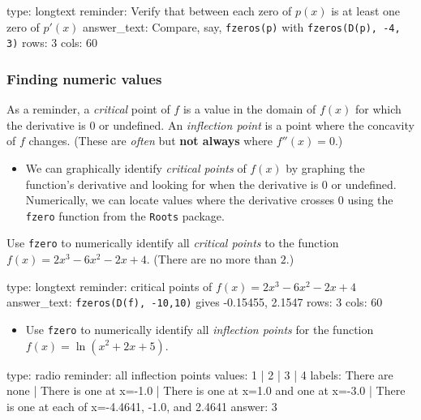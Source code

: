 \documentclass[12pt]{article}
\begin{document}
\begin{answer}
type: longtext
reminder: Verify that between each zero of \( p(x) \) is at least one zero of \( p'(x) \)
answer_text: Compare, say, \verb+fzeros(p)+ with \verb+fzeros(D(p), -4, 3)+ 
rows: 3
cols: 60
\end{answer}

\subsubsection{Finding numeric values}

As a reminder, a \emph{critical} point of $f$ is a value in the domain
of $f(x)$ for which the derivative is $0$ or undefined. An
\emph{inflection point} is a point where the concavity of $f$ changes.
(These are \emph{often} but \textbf{not always} where $f''(x)=0$.)

\begin{itemize}
\itemsep1pt\parskip0pt
\item
  We can graphically identify \emph{critical points} of $f(x)$ by
  graphing the function's derivative and looking for when the derivative
  is 0 or undefined. Numerically, we can locate values where the
  derivative crosses $0$ using the \texttt{fzero} function from the
  \texttt{Roots} package.
\end{itemize}

Use \texttt{fzero} to numerically identify all \emph{critical points} to
the function $f(x) = 2x^3 - 6x^2 - 2x + 4$. (There are no more than
$2$.)

\begin{answer}
type: longtext
reminder: critical points of \( f(x) = 2x^3 - 6x^2 - 2x + 4 \)
answer_text: \verb+fzeros(D(f), -10,10)+ gives -0.15455, 2.1547 
rows: 3
cols: 60
\end{answer}

\begin{itemize}
\itemsep1pt\parskip0pt
\item
  Use \texttt{fzero} to numerically identify all \emph{inflection
  points} for the function $f(x) = \ln(x^2 + 2x + 5)$.
\end{itemize}

\begin{answer}
type: radio
reminder: all inflection points
values: 1 | 2 | 3 | 4
labels: There are none | There is one at x=-1.0 | There is one at x=1.0 and one at x=-3.0 | There is one at each of x=-4.4641, -1.0, and 2.4641
answer: 3
\end{answer}
\end{document}
